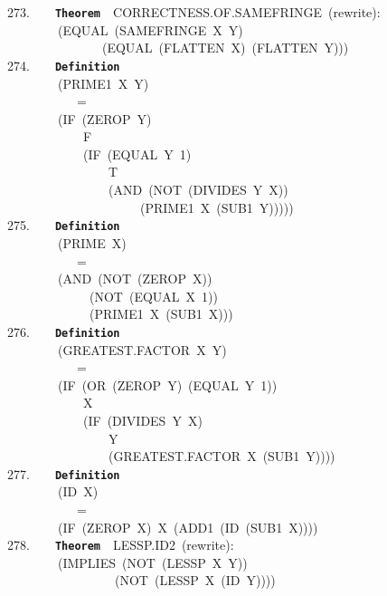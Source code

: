 \documentclass[11pt]{book}
\newenvironment{pubasis}{\begin{flushleft}\ttfamily\small}{\normalsize\rmfamily\end{flushleft}}
\newcommand{\axiomordefinition}[1]{\vspace{6pt}\texttt{\textbf{#1}}}
\begin{document}
\begin{pubasis}
273.~~~~\axiomordefinition{Theorem}~~CORRECT\-NESS.OF.SAMEFRINGE~(rewrite):\\
~~~~~~~~(EQUAL~(SAMEFRINGE~X~Y)\\
~~~~~~~~~~~~~~~(EQUAL~(FLATTEN~X)~(FLATTEN~Y)))\\

274.~~~~\axiomordefinition{Definition}\\
~~~~~~~~(PRIME1~X~Y)\\
~~~~~~~~~~~=\\
~~~~~~~~(IF~(ZEROP~Y)\\
~~~~~~~~~~~~F\\
~~~~~~~~~~~~(IF~(EQUAL~Y~1)\\
~~~~~~~~~~~~~~~~T\\
~~~~~~~~~~~~~~~~(AND~(NOT~(DIVIDES~Y~X))\\
~~~~~~~~~~~~~~~~~~~~~(PRIME1~X~(SUB1~Y)))))\\

275.~~~~\axiomordefinition{Definition}\\
~~~~~~~~(PRIME~X)\\
~~~~~~~~~~~=\\
~~~~~~~~(AND~(NOT~(ZEROP~X))\\
~~~~~~~~~~~~~(NOT~(EQUAL~X~1))\\
~~~~~~~~~~~~~(PRIME1~X~(SUB1~X)))\\

276.~~~~\axiomordefinition{Definition}\\
~~~~~~~~(GREAT\-EST.FAC\-TOR~X~Y)\\
~~~~~~~~~~~=\\
~~~~~~~~(IF~(OR~(ZEROP~Y)~(EQUAL~Y~1))\\
~~~~~~~~~~~~X\\
~~~~~~~~~~~~(IF~(DIVIDES~Y~X)\\
~~~~~~~~~~~~~~~~Y\\
~~~~~~~~~~~~~~~~(GREAT\-EST.FAC\-TOR~X~(SUB1~Y))))\\

277.~~~~\axiomordefinition{Definition}\\
~~~~~~~~(ID~X)\\
~~~~~~~~~~~=\\
~~~~~~~~(IF~(ZEROP~X)~X~(ADD1~(ID~(SUB1~X))))\\

278.~~~~\axiomordefinition{Theorem}~~LESSP.ID2~(rewrite):\\
~~~~~~~~(IMPLIES~(NOT~(LESSP~X~Y))\\
~~~~~~~~~~~~~~~~~(NOT~(LESSP~X~(ID~Y))))\\


\end{pubasis}
\end{document}
